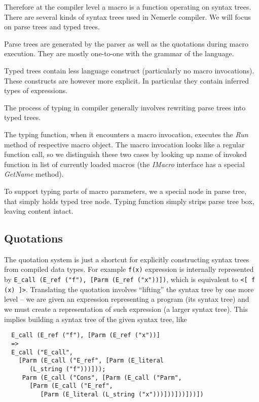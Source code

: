 \documentclass{llncs}
\begin{document}
Therefore at the compiler level a macro is a function operating on
syntax trees. There are several kinds of syntax trees used in Nemerle
compiler. We will focus on parse trees and typed trees.

Parse trees are generated by the parser as well as the quotations during
macro execution. They are mostly one-to-one with the grammar of the
language.

Typed trees contain less language construct (particularly no macro
invocations). These constructs are however more explicit. In particular
they contain inferred types of expressions.

The process of typing in compiler generally involves rewriting parse
trees into typed trees.

The typing function, when it encounters a macro invocation, executes the
\emph{Run} method of respective macro object. The macro invocation looks
like a regular function call, so we distinguish these two cases by
looking up name of invoked function in list of currently loaded macros
(the \emph{IMacro} interface has a special \emph{GetName} method).

To support typing parts of macro parameters, we a special node in parse
tree, that simply holds typed tree node. Typing function simply strips
parse tree box, leaving content intact.


\subsection{Quotations}
The quotation system is just a shortcut for explicitly constructing syntax
trees from compiled data types.  For example \verb,f(x),
expression is internally represented by 
\verb.E_call (E_ref ("f"), [Parm (E_ref ("x"))]).,
which is equivalent to \verb,<[ f (x) ]>,. Translating the quotation involves
``lifting'' the syntax tree by one more level -- we are given an expression 
representing a program (its syntax tree) and we must create a representation 
of such expression (a larger syntax tree).
This implies building a syntax tree of the given syntax tree, like

\begin{verbatim}
  E_call (E_ref ("f"), [Parm (E_ref ("x"))] 
  =>
  E_call ("E_call", 
    [Parm (E_call ("E_ref", [Parm (E_literal 
       (L_string ("f")))]));
     Parm (E_call ("Cons", [Parm (E_call ("Parm", 
       [Parm (E_call ("E_ref", 
          [Parm (E_literal (L_string ("x")))]))]))]))])
\end{verbatim}
\end{document}
